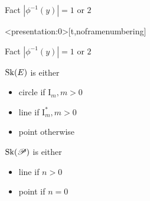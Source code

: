\begin{frame}
	\begin{block}{Fact}
			$|\phi^{-1}(y)| = 1 \text{ or } 2$
		\end{block}


    \pause
\end{frame}
\begin{frame}<presentation:0>[t,noframenumbering]
	\begin{minipage}[t]{.7\textwidth}
		
		\begin{block}{Fact}
			$|\phi^{-1}(y)| = 1 \text{ or } 2$
		\end{block}
		\begin{minipage}[t]{.49\textwidth}
			$\operatorname{Sk}(E)$ is either
			\begin{itemize}
				\item circle if $\mathrm I_m, m >0$
				\item line if $\mathrm I_{m}^*, m > 0$
				\item point otherwise
			\end{itemize}
		\end{minipage}
		\begin{minipage}[t]{.49\textwidth}
			$\operatorname{Sk}(\mathscr P)$ is either
			\begin{itemize}
				\item line if $n > 0$ 
				\item point if $n = 0$
			\end{itemize}
		\end{minipage}
		
	\end{minipage}
	\begin{minipage}[t]{.29\textwidth}
	\end{minipage}
\end{frame}
